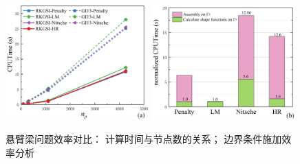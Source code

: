 \begin{figure}[H]
\centering
    \begin{subcaptiongroup}
        \includegraphics[width=0.49\textwidth]{figure/EHR/cantilever/cputime.png}
        \label{ECcputime}
        \includegraphics[width=0.49\textwidth]{figure/EHR/cantilever/efficiency.png}
        \label{ECefficiency}
        \end{subcaptiongroup}
\caption{悬臂梁问题效率对比： 计算时间与节点数的关系； 边界条件施加效率分析}
\end{figure}
